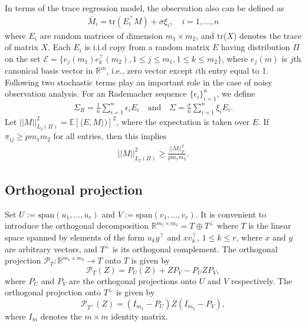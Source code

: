 \documentclass{article} %
\newcommand\mc{\mathcal} %
\begin{document}
In terms of the trace regression model, the observation also can be defined as
\begin{align}
\bar{M}_{i} = \text{tr}(E_i^\top M) + \sigma\xi_i, \quad i=1,...,n
\end{align}
where $E_i$ are random matrices of dimension $m_1 \times m_2$, and tr($X$) denotes the trace of matrix $X$. Each $E_i$ is i.i.d copy from a random matrix $E$ having distribution $\Pi$ on the set $\mathcal{E} = \{e_j(m_1)e_k^\top(m_2), 1\leq j \leq m_1, 1\leq k \leq m_2 \}$, where $e_j(m)$ is $j$th canonical basis vector in $\mathbb{R}^m$, i.e., zero vector except $i$th entry equal to 1. Following two stochastic terms play an important role in the case of noisy observation analysis. For an Rademacher sequence $\{\epsilon_i\}_{i=1}^{n}$, we define
\begin{align}
\Sigma_R = \frac{1}{n}\sum_{i=1}^{n}\epsilon_i E_i \quad \text{and} \quad\Sigma = \frac{\sigma}{n}\sum_{i=1}^{n}\xi_i E_i.
\end{align}
Let $||M||_{L_2(\Pi)}^2 = \mathbb{E}[\langle E,M \rangle)]^2$, where the expectation is taken over ${E}$. If $\pi_{ij} \geq pm_1m_2$ for all entries, then this implies
\begin{align}
\label{eqn:fro_ineq}
||M||_{L_2(\Pi)}^2 \geq \frac{||M||_F^2}{pm_1m_2}.
\end{align}

\subsection{Orthogonal projection}

Set $U := \text{span}(u_1,...,u_r)$ and $V := \text{span}(v_1,...,v_r)$. It is convenient to introduce the orthogonal decomposition $\mathbb{R}^{m_1 \times m_2} = T \oplus T^\perp$ where $T$ is the linear space spanned by elements of the form $u_ky^\top$ and $xv_k^\top$, $1\leq k \leq r$, where $x$ and $y$ are arbitrary vectors, and $T^\perp$ is its orthogonal complement. The orthogonal projection $\mc{P}_T:\mathbb{R}^{m_1 \times m_2} \rightarrow T$ onto $T$ is given by
\begin{equation}
\mc{P}_T(Z) = P_U(Z) + ZP_V - P_UZP_V,
\end{equation}
where $P_U$ and $P_V$ are the orthogonal projections onto $U$ and $V$ respectively. The orthogonal projection onto $T^\perp$ is given by
\begin{equation}
\mc{P}_{T^\perp}(Z) = (I_{m_1} - P_U)Z(I_{m_2} - P_V),
\end{equation}
where $I_m$ denotes the $m \times m$ identity matrix.
\end{document}
